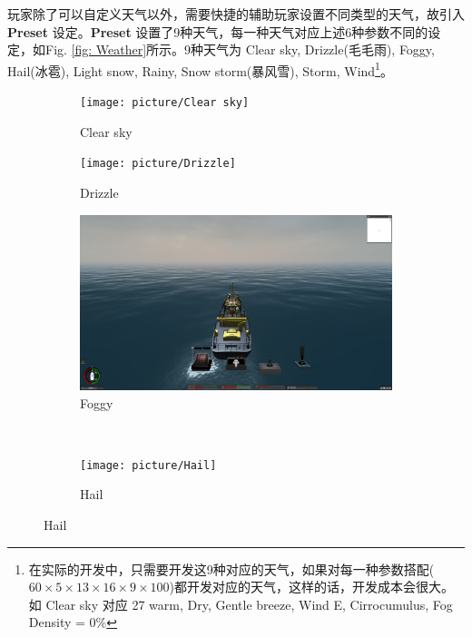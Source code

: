 \documentclass[letterpaper,10pt]{article}
\begin{document}
				玩家除了可以自定义天气以外，需要快捷的辅助玩家设置不同类型的天气，故引入 \textbf{Preset} 设定。\textbf{Preset} 设置了9种天气，每一种天气对应上述6种参数不同的设定，如Fig. \ref{fig: Weather}所示。9种天气为 Clear sky, Drizzle(毛毛雨), Foggy, Hail(冰雹), Light snow, Rainy, Snow storm(暴风雪), Storm, Wind\footnote{在实际的开发中，只需要开发这9种对应的天气，如果对每一种参数搭配($60 \times 5 \times 13 \times 16 \times 9 \times 100$)都开发对应的天气，这样的话，开发成本会很大。如 Clear sky 对应 27 warm, Dry, Gentle breeze, Wind E, Cirrocumulus, Fog Density = 0\%}。
				
				\begin{figure}[ht] 
					\centering 
					
					\begin{subfigure}{0.3\textwidth}
						\texttt{[image: picture/Clear sky]}
						\captionsetup{font=scriptsize}
						\caption{Clear sky}
						\label{fig: Clear sky}
					\end{subfigure}
					\begin{subfigure}{0.3\textwidth}
						\texttt{[image: picture/Drizzle]}
						\captionsetup{font=scriptsize}
						\caption{Drizzle}
						\label{fig: Drizzle}
					\end{subfigure}
					\begin{subfigure}{0.3\textwidth}
						\includegraphics[width=\linewidth]{picture/Foggy}
						\captionsetup{font=scriptsize}
						\caption{Foggy}
						\label{fig: Foggy}	
					\end{subfigure}\\
					\begin{subfigure}{0.3\textwidth}
						\texttt{[image: picture/Hail]}
						\captionsetup{font=scriptsize}
						\caption{Hail}
						\label{fig: Hail}	

\end{subfigure}
\end{figure}
\end{document}

